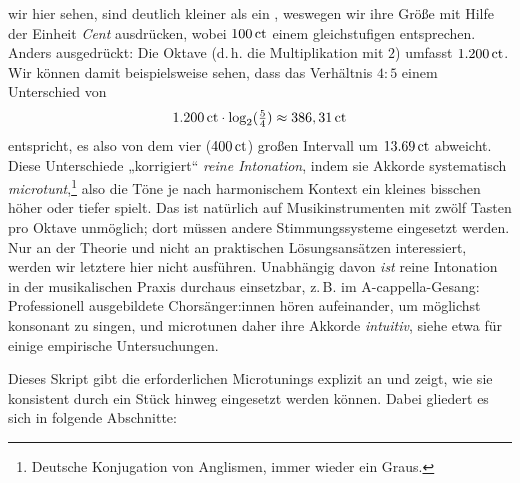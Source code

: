 \documentclass[ngerman,11pt]{scrartcl}
\begin{document}
wir hier sehen, sind deutlich kleiner als ein , weswegen wir ihre Größe
mit Hilfe der Einheit \emph{Cent} ausdrücken, wobei $100\,\mathrm{ct}$ einem
gleichstufigen  entsprechen. Anders ausgedrückt: Die Oktave (d.\,h. die
Multiplikation mit $2$) umfasst $1{.}200\,\mathrm{ct}$. Wir können damit
beispielsweise sehen, dass das Verhältnis $4:5$ einem Unterschied von
\[1{.}200\,\mathrm{ct}\cdot \log_2(\tfrac54) \approx 386,31\,\mathrm{ct}\]%
entspricht, es also von dem vier  ($400\,\mathrm{ct}$) großen Intervall um
$13.69\,\mathrm{ct}$ abweicht. Diese Unterschiede „korrigiert“ \emph{reine
  Intonation}, indem sie Akkorde systematisch
\emph{microtunt},\footnote{Deutsche Konjugation von Anglismen, immer wieder ein
  Graus.} also die Töne je nach harmonischem Kontext ein kleines bisschen höher
oder tiefer spielt. Das ist natürlich auf Musikinstrumenten mit zwölf Tasten pro
Oktave unmöglich; dort müssen andere Stimmungssysteme eingesetzt werden. Nur an
der Theorie und nicht an praktischen Lösungsansätzen interessiert, werden wir
letztere hier nicht ausführen. Unabhängig davon \emph{ist} reine Intonation in
der musikalischen Praxis durchaus einsetzbar, z.\,B. im A-cappella-Gesang:
Professionell ausgebildete Chorsänger:innen hören aufeinander, um möglichst
konsonant zu singen, und microtunen daher ihre Akkorde
\emph{intuitiv}, siehe etwa \cite{Maria} für einige empirische Untersuchungen.

Dieses Skript gibt die erforderlichen Microtunings explizit an und zeigt, wie
sie konsistent durch ein Stück hinweg eingesetzt werden können. Dabei gliedert
es sich in folgende Abschnitte:
\end{document}
